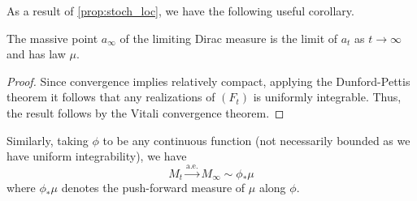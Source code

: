 As a result of \ref{prop:stoch_loc}, we have the following useful corollary.

\begin{corollary}\label{cor:lim_dis}
  The massive point \(a_\infty\) of the limiting Dirac measure is the limit of \(a_t\) as 
  \(t \to \infty\) and has law \(\mu\).
\end{corollary}
\begin{proof}
  Since convergence implies relatively compact, applying the Dunford-Pettis theorem it follows that 
  any realizations of \((F_t)\) is uniformly integrable. Thus, the result follows by the Vitali 
  convergence theorem.
\end{proof}

\begin{corollary}
  Similarly, taking \(\phi\) to be any continuous function (not necessarily bounded as we have uniform 
  integrability), we have
  \begin{equation}\label{eq:lim_mart}
    M_t \xrightarrow{\text{a.e.}} M_\infty \sim \phi_* \mu
  \end{equation}
  where \(\phi_*\mu\) denotes the push-forward measure of \(\mu\) along \(\phi\).
\end{corollary}

